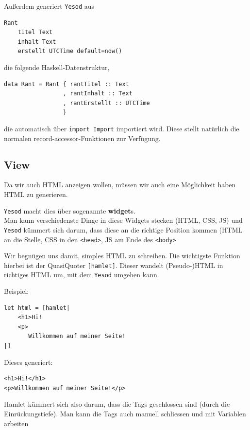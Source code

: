 \documentclass{beamer}
\begin{document}
\begin{frame}[fragile]
Außerdem generiert \texttt{Yesod} aus
\begin{verbatim}
Rant
    titel Text
    inhalt Text
    erstellt UTCTime default=now()
\end{verbatim}
\pause
die folgende Haskell-Datenstruktur,
\smallskip

\begin{verbatim}
data Rant = Rant { rantTitel :: Text
                 , rantInhalt :: Text
                 , rantErstellt :: UTCTime
                 }
\end{verbatim}
\pause
\smallskip

die automatisch über \texttt{import Import} importiert wird. Diese stellt natürlich die normalen record-accessor-Funktionen zur Verfügung.
\end{frame}

\subsection{View}

\begin{frame}[fragile]
Da wir auch HTML anzeigen wollen, müssen wir auch eine Möglichkeit haben HTML zu generieren.\\\pause\par
\texttt{Yesod} macht dies über sogenannte \textbf{widget}s. \\\pause
Man kann verschiedenste Dinge in diese Widgets stecken (HTML, CSS, JS) und \texttt{Yesod} kümmert sich darum, dass diese an die richtige Position kommen (HTML an die Stelle, CSS in den \texttt{<head>}, JS am Ende des \texttt{<body>}\\\par
\pause
Wir begnügen uns damit, simples HTML zu schreiben. Die wichtigste Funktion hierbei ist der QuasiQuoter \texttt{[hamlet]}. Dieser wandelt (Pseudo-)HTML in richtiges HTML um, mit dem \texttt{Yesod} umgehen kann.
\end{frame}

\begin{frame}[fragile]
Beispiel:\\\par
\begin{verbatim}
let html = [hamlet|
    <h1>Hi!
    <p>
       Willkommen auf meiner Seite!
|]
\end{verbatim}
\pause
Dieses generiert:
\begin{verbatim}
<h1>Hi!</h1>
<p>Willkommen auf meiner Seite!</p>
\end{verbatim}
\pause
Hamlet kümmert sich also darum, dass die Tags geschlossen sind (durch die Einrückungstiefe). Man kann die Tags auch manuell schliessen und mit Variablen arbeiten
\end{frame}
\end{document}
